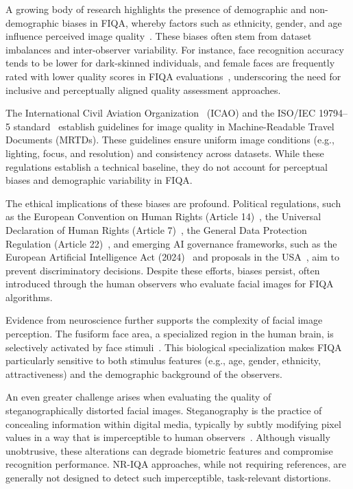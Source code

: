 A growing body of research highlights the presence of demographic and non-demographic biases in FIQA, whereby factors such as ethnicity, gender, and age influence perceived image quality~\cite{Kabbani2024, 9304865, Cavazos2021, tapia2024beauty}. These biases often stem from dataset imbalances and inter-observer variability. For instance, face recognition accuracy tends to be lower for dark-skinned individuals, and female faces are frequently rated with lower quality scores in FIQA evaluations~\cite{Huang2020}, underscoring the need for inclusive and perceptually aligned quality assessment approaches.

The International Civil Aviation Organization~\cite{icao_2015} (ICAO) and the ISO/IEC 19794--5 standard~\cite{iso_iec29794-5_2010} establish guidelines for image quality in Machine-Readable Travel Documents (MRTDs). These guidelines ensure uniform image conditions (e.g., lighting, focus, and resolution) and consistency across datasets. While these regulations establish a technical baseline, they do not account for perceptual biases and demographic variability in FIQA.\@

The ethical implications of these biases are profound. Political regulations, such as the European Convention on Human Rights (Article 14)~\cite{echr_article14}, the Universal Declaration of Human Rights (Article 7)~\cite{udhr_article7}, the General Data Protection Regulation (Article 22)~\cite{gdpr_article22}, and emerging AI governance frameworks, such as the European Artificial Intelligence Act (2024)~\cite{eu_ai_act_2024} and proposals in the USA~\cite{us_ai_bill_rights_2022}, aim to prevent discriminatory decisions. Despite these efforts, biases persist, often introduced through the human observers who evaluate facial images for FIQA algorithms.

Evidence from neuroscience further supports the complexity of facial image perception. The fusiform face area, a specialized region in the human brain, is selectively activated by face stimuli~\cite{kanwisher2006fusiform, tsao2008mechanisms}. This biological specialization makes FIQA particularly sensitive to both stimulus features (e.g., age, gender, ethnicity, attractiveness) and the demographic background of the observers.

An even greater challenge arises when evaluating the quality of steganographically distorted facial images. Steganography is the practice of concealing information within digital media, typically by subtly modifying pixel values in a way that is imperceptible to human observers~\cite{steganography}. Although visually unobtrusive, these alterations can degrade biometric features and compromise recognition performance. NR-IQA approaches, while not requiring references, are generally not designed to detect such imperceptible, task-relevant distortions.

